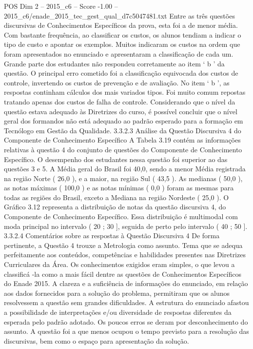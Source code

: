 \begin{textsample}{POS Dim 2 – 2015\_c6 – Score -1.00 – 2015\_c6/enade\_2015\_tec\_gest\_qual\_d7c5047481.txt}
Entre as três questões discursivas de Conhecimentos Específicos da prova, esta foi a de menor média.
Com bastante frequência, ao classificar os custos, os alunos tendiam a indicar o tipo de custo e apontar os exemplos.
Muitos indicaram os custos na ordem que foram apresentados no enunciado e apresentaram a classificação de cada um.
Grande parte dos estudantes não respondeu corretamente ao item ‘ b ’ da questão.
O principal erro cometido foi a classificação equivocada dos custos de controle, invertendo os custos de prevenção e de avaliação.
No item ‘ b ’, as respostas continham cálculos dos mais variados tipos.
Foi muito comum repostas tratando apenas dos custos de falha de controle.
Considerando que o nível da questão estava adequado às Diretrizes do curso, é possível concluir que o nível geral dos formandos não está adequado ao padrão esperado para a formação em Tecnólogo em Gestão da Qualidade. 3.3.2.3 Análise da Questão Discursiva 4 do Componente de Conhecimento Específico A Tabela 3.19 contém as informações relativas à questão 4 do conjunto de questões do Componente de Conhecimento Específico.
O desempenho dos estudantes nessa questão foi superior ao das questões 3 e 5.
A Média geral do Brasil foi 40,0, sendo a menor Média registrada na região Norte ( 26,0 ), e a maior, na região Sul ( 43,5 ).
As medianas ( 50,0 ), as notas máximas ( 100,0 ) e as notas mínimas ( 0,0 ) foram as mesmas para todas as regiões do Brasil, exceto a Mediana na região Nordeste ( 25,0 ).
O Gráfico 3.12 representa a distribuição de notas da questão discursiva 4, do Componente de Conhecimento Específico.
Essa distribuição é multimodal com moda principal no intervalo ( 20 ; 30 ], seguida de perto pelo intervalo ( 40 ; 50 ]. 3.3.2.4 Comentários sobre as respostas à Questão Discursiva 4 De forma pertinente, a Questão 4 trouxe a Metrologia como assunto.
Tema que se adequa perfeitamente aos conteúdos, competências e habilidades presentes nas Diretrizes Curriculares da Área.
Os conhecimentos exigidos eram simples, o que levou a classificá -la como a mais fácil dentre as questões de Conhecimentos Específicos do Enade 2015.
A clareza e a suficiência de informações do enunciado, em relação aos dados fornecidos para a solução do problema, permitiram que os alunos resolvessem a questão sem grandes dificuldades.
A estrutura do enunciado afastou a possibilidade de interpretações e/ou diversidade de respostas diferentes da esperada pelo padrão adotado.
Os poucos erros se deram por desconhecimento do assunto.
A questão foi a que menos ocupou o tempo previsto para a resolução das discursivas, bem como o espaço para apresentação da solução.

\end{textsample}
